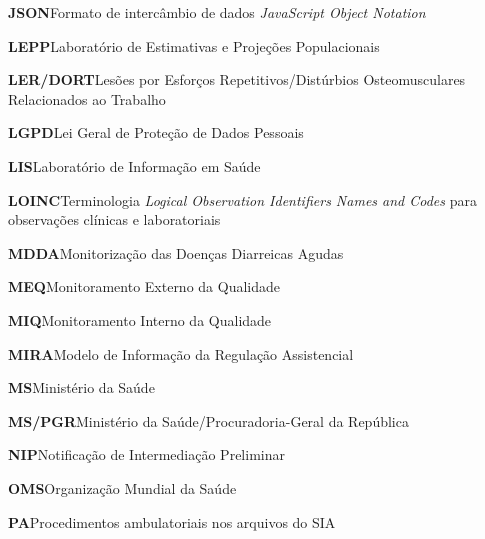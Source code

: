 \noindent\textbf{JSON}\hspace{1em}Formato de intercâmbio de dados \emph{JavaScript Object Notation}\par\smallskip
\noindent\textbf{LEPP}\hspace{1em}Laboratório de Estimativas e Projeções Populacionais\par\smallskip
\noindent\textbf{LER/DORT}\hspace{1em}Lesões por Esforços Repetitivos/Distúrbios Osteomusculares Relacionados ao Trabalho\par\smallskip
\noindent\textbf{LGPD}\hspace{1em}Lei Geral de Proteção de Dados Pessoais\par\smallskip
\noindent\textbf{LIS}\hspace{1em}Laboratório de Informação em Saúde\par\smallskip
\noindent\textbf{LOINC}\hspace{1em}Terminologia \emph{Logical Observation Identifiers Names and Codes} para observações clínicas e laboratoriais\par\smallskip
\noindent\textbf{MDDA}\hspace{1em}Monitorização das Doenças Diarreicas Agudas\par\smallskip
\noindent\textbf{MEQ}\hspace{1em}Monitoramento Externo da Qualidade\par\smallskip
\noindent\textbf{MIQ}\hspace{1em}Monitoramento Interno da Qualidade\par\smallskip
\noindent\textbf{MIRA}\hspace{1em}Modelo de Informação da Regulação Assistencial\par\smallskip
\noindent\textbf{MS}\hspace{1em}Ministério da Saúde\par\smallskip
\noindent\textbf{MS/PGR}\hspace{1em}Ministério da Saúde/Procuradoria-Geral da República\par\smallskip
\noindent\textbf{NIP}\hspace{1em}Notificação de Intermediação Preliminar\par\smallskip
\noindent\textbf{OMS}\hspace{1em}Organização Mundial da Saúde\par\smallskip
\noindent\textbf{PA}\hspace{1em}Procedimentos ambulatoriais nos arquivos do SIA\par\smallskip
